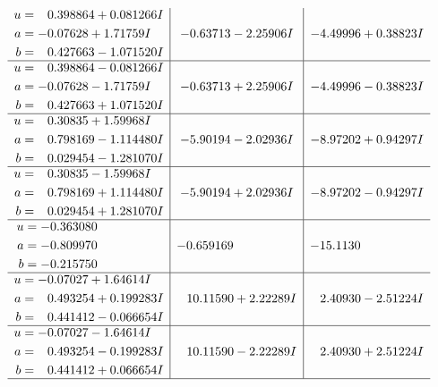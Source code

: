 \documentclass[1p]{elsarticle_modified}
\theoremstyle{definition}
\begin{document}
$$\begin{array}{c|c|c}
\begin{aligned}
u &= \phantom{-}0.398864 + 0.081266 I \\
a &= -0.07628 + 1.71759 I \\
b &= \phantom{-}0.427663 - 1.071520 I\end{aligned}
 & -0.63713 - 2.25906 I & -4.49996 + 0.38823 I \\ \hline\begin{aligned}
u &= \phantom{-}0.398864 - 0.081266 I \\
a &= -0.07628 - 1.71759 I \\
b &= \phantom{-}0.427663 + 1.071520 I\end{aligned}
 & -0.63713 + 2.25906 I & -4.49996 - 0.38823 I \\ \hline\begin{aligned}
u &= \phantom{-}0.30835 + 1.59968 I \\
a &= \phantom{-}0.798169 - 1.114480 I \\
b &= \phantom{-}0.029454 - 1.281070 I\end{aligned}
 & -5.90194 - 2.02936 I & -8.97202 + 0.94297 I \\ \hline\begin{aligned}
u &= \phantom{-}0.30835 - 1.59968 I \\
a &= \phantom{-}0.798169 + 1.114480 I \\
b &= \phantom{-}0.029454 + 1.281070 I\end{aligned}
 & -5.90194 + 2.02936 I & -8.97202 - 0.94297 I \\ \hline\begin{aligned}
u &= -0.363080\phantom{ +0.000000I} \\
a &= -0.809970\phantom{ +0.000000I} \\
b &= -0.215750\phantom{ +0.000000I}\end{aligned}
 & -0.659169\phantom{ +0.000000I} & -15.1130\phantom{ +0.000000I} \\ \hline\begin{aligned}
u &= -0.07027 + 1.64614 I \\
a &= \phantom{-}0.493254 + 0.199283 I \\
b &= \phantom{-}0.441412 - 0.066654 I\end{aligned}
 & \phantom{-}10.11590 + 2.22289 I & \phantom{-}2.40930 - 2.51224 I \\ \hline\begin{aligned}
u &= -0.07027 - 1.64614 I \\
a &= \phantom{-}0.493254 - 0.199283 I \\
b &= \phantom{-}0.441412 + 0.066654 I\end{aligned}
 & \phantom{-}10.11590 - 2.22289 I & \phantom{-}2.40930 + 2.51224 I\\
 \hline 
 \end{array}$$\newpage\newpage\renewcommand{\arraystretch}{1}
\end{document}
